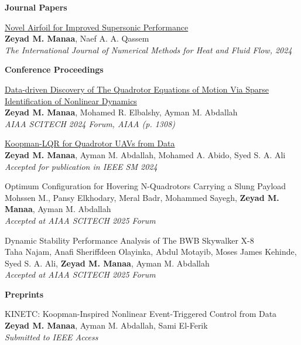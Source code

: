 \textbf{Journal Papers}
\begin{bibenum}
    \item \href{https://www.emerald.com/insight/content/doi/10.1108/HFF-06-2024-0433/full/html}{Novel Airfoil for Improved Supersonic Performance}\\
    \textbf{Zeyad M. Manaa}, Naef A. A. Qassem\\
    \textit{The International Journal of Numerical Methods for Heat and Fluid Flow, 2024}
\end{bibenum}
\vspace{0.5cm}

\textbf{Conference Proceedings}
\begin{bibenum}
    \item \href{https://arxiv.org/pdf/2305.16500}{{Data-driven Discovery of The Quadrotor Equations of Motion Via Sparse Identification of Nonlinear Dynamics}}\\
    \textbf{Zeyad M. Manaa}, Mohamed R. Elbalshy, Ayman M. Abdallah\\
    \textit{AIAA SCITECH 2024 Forum, AIAA (p. 1308)}

    \item \href{https://arxiv.org/pdf/2406.17973}{Koopman-LQR for Quadrotor UAVs from Data}\\
    \textbf{Zeyad M. Manaa}, Ayman M. Abdallah, Mohamed A. Abido, Syed S. A. Ali\\
    \textit{Accepted for publication in IEEE SM 2024}

    \item {Optimum Configuration for Hovering N-Quadrotors Carrying a Slung Payload}\\
    Mohssen M., Pansy Elkhodary, Meral Badr, Mohammed Sayegh, \textbf{Zeyad M. Manaa}, Ayman M. Abdallah\\
    \textit{Accepted at AIAA SCITECH 2025 Forum}

    \item {Dynamic Stability Performance Analysis of The BWB Skywalker X-8}\\
    Taha Najam, Anafi Sheriffdeen Olayinka, Abdul Motayib, Moses James Kehinde, Syed S. A. Ali, \textbf{Zeyad M. Manaa}, Ayman M. Abdallah\\
    \textit{Accepted at AIAA SCITECH 2025 Forum}
\end{bibenum}
\vspace{0.5cm}

\textbf{Preprints}
\begin{bibenum}
    \item {KINETC: Koopman-Inspired Nonlinear Event-Triggered Control from Data}\\
    \textbf{Zeyad M. Manaa}, Ayman M. Abdallah, Sami El-Ferik\\
    \textit{Submitted to IEEE Access}
\end{bibenum}